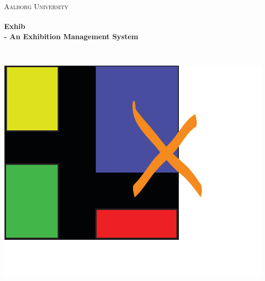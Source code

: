 \begin{titlingpage}\centering

\textsc{\LARGE Aalborg University}\\[0.3cm]

\HRule \\[0.4cm]
{\huge \bfseries Exhib}\\[0.5cm]
{\Large \bfseries - An Exhibition Management System}

\HRule \\[2cm]

\begin{minipage}{\columnwidth}
\hspace*{2.5cm}\includegraphics[width=0.85\linewidth]{img/icon_big.png}
\end{minipage}


\end{titlingpage}
